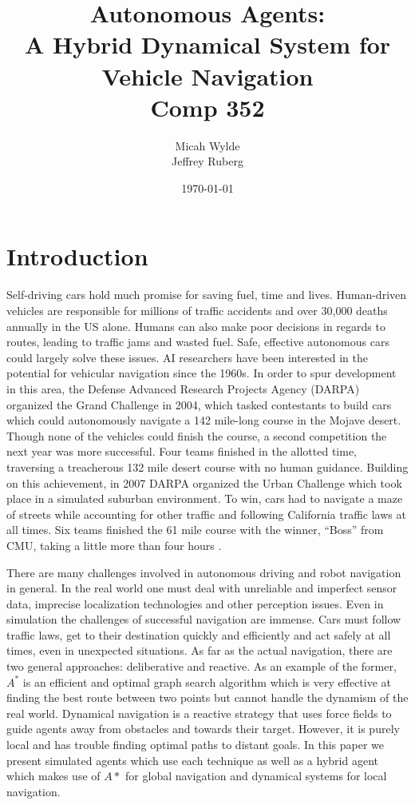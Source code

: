 \documentclass{article}
\author{Micah Wylde\\Jeffrey Ruberg}
\date{\today}
\title{Autonomous Agents:\\
A Hybrid Dynamical System for Vehicle Navigation\\
Comp 352}
\begin{document}
\maketitle

\section{Introduction}
Self-driving cars hold much promise for saving fuel, time and
lives. Human-driven vehicles are responsible for millions of traffic
accidents and over 30,000 deaths annually in the US alone. Humans can
also make poor decisions in regards to routes, leading to traffic jams
and wasted fuel. Safe, effective autonomous cars could largely solve
these issues. AI researchers have been interested in the potential for
vehicular navigation since the 1960s. In order to spur development in
this area, the Defense Advanced Research Projects Agency (DARPA)
organized the Grand Challenge in 2004, which tasked contestants to
build cars which could autonomously navigate a 142 mile-long course in
the Mojave desert. Though none of the vehicles could finish the
course, a second competition the next year was more successful. Four
teams finished in the allotted time, traversing a treacherous 132 mile
desert course with no human guidance. Building on this achievement, in
2007 DARPA organized the Urban Challenge which took place in a
simulated suburban environment. To win, cars had to navigate a maze of
streets while accounting for other traffic and following California
traffic laws at all times. Six teams finished the 61 mile course with
the winner, ``Boss'' from CMU, taking a little more than four hours
\cite{robotic_cars}.

There are many challenges involved in autonomous driving and robot
navigation in general. In the real world one must deal with unreliable
and imperfect sensor data, imprecise localization technologies and
other perception issues. Even in simulation the challenges of
successful navigation are immense. Cars must follow traffic laws, get
to their destination quickly and efficiently and act safely at all
times, even in unexpected situations. As far as the actual navigation,
there are two general approaches: deliberative and reactive. As an
example of the former, $A^*$ is an efficient and optimal graph search
algorithm which is very effective at finding the best route between
two points but cannot handle the dynamism of the real world. Dynamical
navigation is a reactive strategy that uses force fields to guide
agents away from obstacles and towards their target. However, it is
purely local and has trouble finding optimal paths to distant
goals. In this paper we present simulated agents which use each
technique as well as a hybrid agent which makes use of $A*$ for global
navigation and dynamical systems for local navigation.
\end{document}
